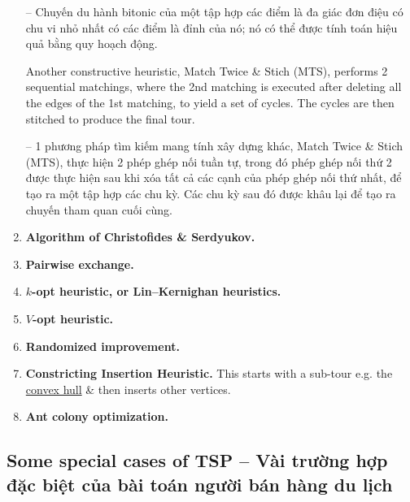 \documentclass{article}
\begin{document}
\begin{enumerate}
    -- Chuyến du hành bitonic của một tập hợp các điểm là đa giác đơn điệu có chu vi nhỏ nhất có các điểm là đỉnh của nó; nó có thể được tính toán hiệu quả bằng quy hoạch động.
    
    Another constructive heuristic, Match Twice \& Stich (MTS), performs 2 sequential matchings, where the 2nd matching is executed after deleting all the edges of the 1st matching, to yield a set of cycles. The cycles are then stitched to produce the final tour.
    
    -- 1 phương pháp tìm kiếm mang tính xây dựng khác, Match Twice \& Stich (MTS), thực hiện 2 phép ghép nối tuần tự, trong đó phép ghép nối thứ 2 được thực hiện sau khi xóa tất cả các cạnh của phép ghép nối thứ nhất, để tạo ra một tập hợp các chu kỳ. Các chu kỳ sau đó được khâu lại để tạo ra chuyến tham quan cuối cùng.
    \item {\bf Algorithm of {\sc Christofides \& Serdyukov}.}
    \item {\bf Pairwise exchange.}
    \item {\bf$k$-opt heuristic, or Lin--Kernighan heuristics.}
    \item {\bf$V$-opt heuristic.}
    \item {\bf Randomized improvement.}
    \item {\bf Constricting Insertion Heuristic.} This starts with a sub-tour e.g. the \href{https://en.wikipedia.org/wiki/Convex_hull}{convex hull} \& then inserts other vertices.
    \item {\bf Ant colony optimization.}
\end{enumerate}


\subsection{Some special cases of TSP -- Vài trường hợp đặc biệt của bài toán người bán hàng du lịch}

\end{document}
